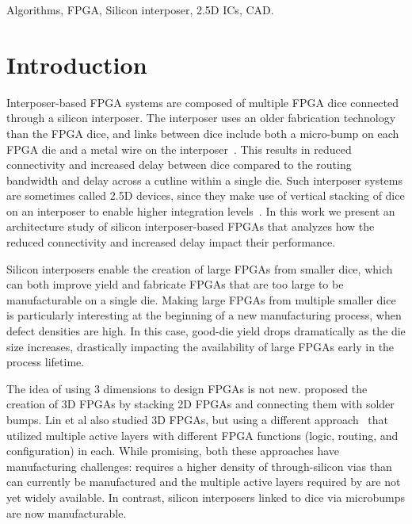 \documentclass[journal]{IEEEtran}
\begin{document}
\begin{IEEEkeywords}
Algorithms, FPGA, Silicon interposer, 2.5D ICs, CAD. 
\end{IEEEkeywords}



\section{Introduction}
\label{introSection} 
Interposer-based FPGA systems are composed of multiple FPGA dice connected through a silicon interposer. The interposer uses an older fabrication technology than the FPGA dice, and links between dice include both a micro-bump on each FPGA die and a metal wire on the interposer~\cite{xilinxTSVperformance}. This results in reduced connectivity and increased delay between dice compared to the routing bandwidth and delay across a cutline within a single die. Such interposer systems are sometimes called 2.5D devices, since they make use of vertical stacking of dice on an interposer to enable higher integration levels~\cite{3dhandbook}. In this work we present an architecture study of silicon interposer-based FPGAs that analyzes how the reduced connectivity and increased delay impact their performance.

Silicon interposers enable the creation of large FPGAs from smaller dice, which can both improve yield and fabricate FPGAs that are too large to be manufacturable on a single die. Making large FPGAs from multiple smaller dice is particularly interesting at the beginning of a new manufacturing process, when defect densities are high. In this case, good-die yield drops dramatically as the die size increases, drastically impacting the availability of large FPGAs early in the process lifetime.

The idea of using 3 dimensions to design FPGAs is not new. \cite{3dfpga1995} proposed the creation of 3D FPGAs by stacking 2D FPGAs and connecting them with solder bumps. Lin et al also studied 3D FPGAs, but using a different approach~\cite{3dfpga} that utilized multiple active layers with different FPGA functions (logic, routing, and configuration) in each. While promising, both these approaches have manufacturing challenges: \cite{3dfpga1995} requires a higher density of through-silicon vias than can currently be manufactured and the multiple active layers required by \cite{3dfpga} are not yet widely available. In contrast, silicon interposers linked to dice via microbumps are now manufacturable.
\end{document}
